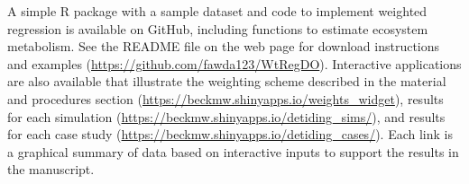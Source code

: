 A simple R package with a sample dataset and code to implement weighted regression is available on GitHub, including functions to estimate ecosystem metabolism.  See the README file on the web page for download instructions and examples (\href{https://github.com/fawda123/WtRegDO}{https://github.com/fawda123/WtRegDO}).  Interactive applications are also available that illustrate the weighting scheme described in the material and procedures section (\href{https://beckmw.shinyapps.io/weights_widget}{https://beckmw.shinyapps.io/weights\_widget}), results for each simulation (\href{https://beckmw.shinyapps.io/detiding_sims/}{https://beckmw.shinyapps.io/detiding\_sims/}), and results for each case study (\href{https://beckmw.shinyapps.io/detiding_cases/}{https://beckmw.shinyapps.io/detiding\_cases/}).  Each link is a graphical summary of data based on interactive inputs to support the results in the manuscript.